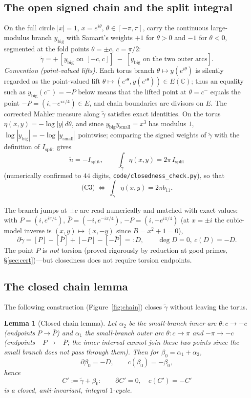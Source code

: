\documentclass[preprint,12pt]{elsarticle}
\newtheorem{lemma}[theorem]{Lemma}
\theoremstyle{definition}
\theoremstyle{remark}
\newcommand{\C}{\mathbb{C}}
\begin{document}
\subsection{The open signed chain and the split integral}

On the full circle $|x|=1$, $x=e^{i\theta}$, $\theta\in[-\pi,\pi]$, carry the
continuous large-modulus branch $y_{\mathrm{big}}$ with Samart's weights
$+1$ for $\theta>0$ and $-1$ for $\theta<0$, segmented at the fold points
$\theta=\pm c$, $c=\pi/2$:
\[
  \tilde\gamma
  =+\,[y_{\mathrm{big}}\text{ on }[-c,c]]
  \;-\;[y_{\mathrm{big}}\text{ on the two outer arcs}].
\]
\emph{Convention (point-valued lifts).}  Each torus branch
$\theta\mapsto y(e^{i\theta})$ is silently regarded as the point-valued
lift $\theta\mapsto(e^{i\theta},y(e^{i\theta}))\in E(\C)$; thus an
equality such as $y_{\mathrm{big}}(c^-)=-P$ below means that the lifted
point at $\theta=c^-$ equals the point $-P=(i,-e^{i\pi/4})\in E$, and
chain boundaries are divisors on $E$.
The corrected Mahler measure along $\tilde\gamma$ satisfies exact
identities. On the torus $\eta(x,y)=-\log|y|\,d\theta$, and since
$y_{\mathrm{big}}y_{\mathrm{small}}=x^3$ has modulus $1$,
$\log|y_{\mathrm{big}}|=-\log|y_{\mathrm{small}}|$ pointwise; comparing the
signed weights of $\tilde\gamma$ with the definition of $I_{\mathrm{split}}$
gives
\[
  \tilde n=-I_{\mathrm{split}},\qquad
  \int_{\tilde\gamma}\eta(x,y)=2\pi\,I_{\mathrm{split}}
\]
(numerically confirmed to $44$ digits,
\texttt{code/closedness\_check.py}), so that
\[
  \text{(C3)}\ \Longleftrightarrow\ \int_{\tilde\gamma}\eta(x,y)=2\pi b_{11}.
\]

The branch jumps at $\pm c$ are read numerically and matched with exact
values: with $P=(i,e^{i\pi/4})$, $\bar P=(-i,e^{-i\pi/4})$,
$-P=(i,-e^{i\pi/4})$ (at $x=\pm i$ the cubic-model inverse is
$(x,y)\mapsto(x,-y)$ since $B=x^2+1=0$),
\[
  \partial\tilde\gamma=[P]-[\bar P]+[-P]-[-\bar P]=:D,
  \qquad \deg D=0,\ c(D)=-D.
\]
The point $P$ is \emph{not} torsion (proved rigorously by reduction at good
primes, \S\ref{sec:cert})---but closedness does not
require torsion endpoints.

\subsection{The closed chain lemma}

The following construction (Figure~\ref{fig:chain}) closes $\tilde\gamma$
without leaving the torus.

\begin{lemma}[Closed chain lemma]\label{lem:closed}Let $\alpha_2$ be the small-branch inner arc $\theta:c\to-c$ (endpoints
$P\to\bar P$) and $\alpha_1$ the small-branch outer arc
$\theta:c\to\pi$ and $-\pi\to-c$ (endpoints $-P\to-\bar P$; the inner
interval cannot join these two points since the small branch does not pass
through them). Then for $\beta_0=\alpha_1+\alpha_2$,
\[
  \partial\beta_0=-D,\qquad c(\beta_0)=-\beta_0,
\]
hence
\[
  C':=\tilde\gamma+\beta_0:\qquad \partial C'=0,\quad c(C')=-C'
\]
is a closed, anti-invariant, integral $1$-cycle.
\end{lemma}
\end{document}
